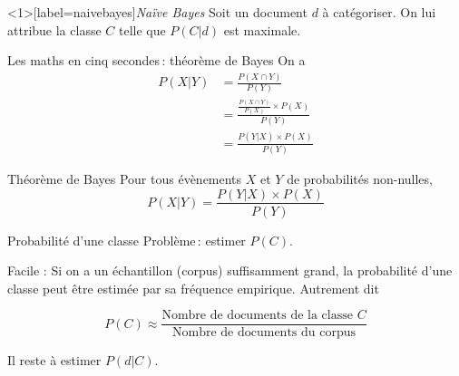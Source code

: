 \documentclass[hyperref={unicode}, xcolor={svgnames}, french]{beamer}
\begin{document}
\begin{frame}<1>[label=naivebayes]{\emph{Naïve Bayes}}
    Soit un document $d$ à catégoriser.
    On lui attribue la classe $C$ telle que $P(C|d)$ est maximale.




\end{frame}

\begin{frame}{Les maths en cinq secondes : théorème de Bayes}
    On a
    \begin{align}
        P(X|Y)
            &= \frac{P(X∩Y)}{P(Y)}\\
            &= \frac{\frac{P(X∩Y)}{P(X)}×P(X)}{P(Y)}\\
            &= \frac{P(Y|X)×P(X)}{P(Y)}
    \end{align}
    \begin{block}{Théorème de Bayes}
        Pour tous évènements $X$ et $Y$ de probabilités non-nulles,
        \begin{equation}
            P(X|Y)=\frac{P(Y|X)×P(X)}{P(Y)}
        \end{equation}
    \end{block}
\end{frame}


\begin{frame}{Probabilité d'une classe}
	Problème : estimer $P(C)$.

	\pause
	Facile : Si on a un échantillon (corpus) suffisamment grand, la probabilité d'une classe peut être estimée par sa fréquence empirique. Autrement dit

	\pause

	\begin{equation}
		P(C) ≈ \frac{\text{Nombre de documents de la classe $C$}}{\text{Nombre de documents du corpus}}
	\end{equation}

	\pause
	Il reste à estimer $P(d|C)$.
\end{frame}
\end{document}
